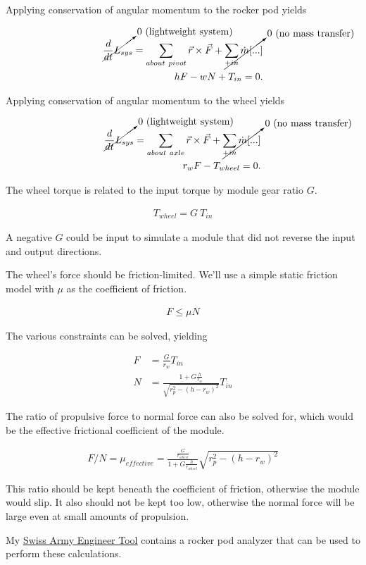 \documentclass[10pt,letterpaper]{article}
\begin{document}
Applying conservation of angular momentum to the rocker pod yields

\begin{align}
	\cancelto{\mbox{0 (lightweight system)}}{\frac{d}{dt} L_{sys}} = \sum_{about\ pivot} \vec{r} \times \vec{F} + \cancelto{\mbox{0 (no mass transfer)}}{\sum_{+in} \dot{m} [...]} \nonumber \\
	h F - w N + T_{in} = 0 .
\end{align}

Applying conservation of angular momentum to the wheel yields

\begin{align}
	\cancelto{\mbox{0 (lightweight system)}}{\frac{d}{dt} L_{sys}} = \sum_{about\ axle} \vec{r} \times \vec{F} + \cancelto{\mbox{0 (no mass transfer)}}{\sum_{+in} \dot{m} [...]} \nonumber \\
	r_{w} F - T_{wheel} = 0 .
\end{align}

The wheel torque is related to the input torque by module gear ratio $G$.

\begin{align}
	T_{wheel} = G \ T_{in}
\end{align}

A negative $G$ could be input to simulate a module that did not reverse the input and output directions.

The wheel's force should be friction-limited. We'll use a simple static friction model with $\mu$ as the coefficient of friction.

\begin{align}
	F \leq \mu N	
\end{align}

The various constraints can be solved, yielding

\begin{align}
	F &= \frac{G}{r_{w}} T_{in} \\
	N &= \frac{1 + G \frac{h}{r_{w}}}{\sqrt{r_{p}^2 - (h - r_{w})^2}} T_{in}
\end{align}

The ratio of propulsive force to normal force can also be solved for, which would be the effective frictional coefficient of the module.

\begin{align}
	F/N = \mu_{effective} = \frac{\frac{G}{r_{wheel}}}{ 1 + G \frac{h}{r_{wheel}} } \sqrt{r_{p}^2 - (h - r_{w})^2}
\end{align}

This ratio should be kept beneath the coefficient of friction, otherwise the module would slip. It also should not be kept too low, otherwise the normal force will be large even at small amounts of propulsion.

My \href{https://thaddeus-maximus.github.io/swissarmyengineer/rockerpod}{\color{red}\underline{Swiss Army Engineer Tool}} contains a rocker pod analyzer that can be used to perform these calculations.
	
\end{document}
